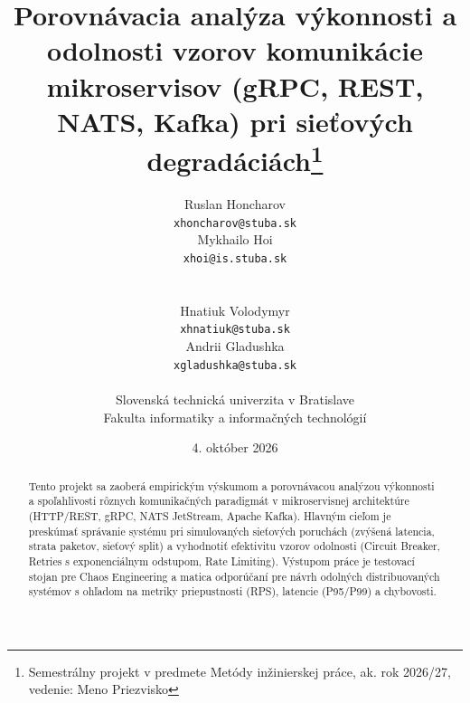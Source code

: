 \documentclass[10pt,twoside,slovak,a4paper]{article}
\title{Porovnávacia analýza výkonnosti a odolnosti vzorov komunikácie mikroservisov (gRPC, REST, NATS, Kafka) pri sieťových degradáciách\thanks{Semestrálny projekt v predmete Metódy inžinierskej práce, ak. rok 2026/27, vedenie: Meno Priezvisko}}
\author{
    \begin{minipage}{0.45\textwidth}
        \centering
        Ruslan Honcharov\\[2pt]
        {\small \texttt{xhoncharov@stuba.sk}}
    \end{minipage}
    \begin{minipage}{0.45\textwidth}
        \centering
        Mykhailo Hoi\\[2pt]
        {\small \texttt{xhoi@is.stuba.sk}}
    \end{minipage}
    \\[12pt]
    \begin{minipage}{0.45\textwidth}
        \centering
        Hnatiuk Volodymyr\\[2pt]
        {\small \texttt{xhnatiuk@stuba.sk}}
    \end{minipage}
    \begin{minipage}{0.45\textwidth}
        \centering
        Andrii Gladushka\\[2pt]
        {\small \texttt{xgladushka@stuba.sk}}
    \end{minipage}
    \\[14pt]
    {\small Slovenská technická univerzita v Bratislave}\\
    {\small Fakulta informatiky a informačných technológií}
}
\date{\small 4. október 2026}
\begin{document}
\maketitle

\begin{abstract}
Tento projekt sa zaoberá empirickým výskumom a porovnávacou analýzou výkonnosti a spoľahlivosti rôznych komunikačných paradigmát v mikroservisnej architektúre (HTTP/REST, gRPC, NATS JetStream, Apache Kafka). Hlavným cieľom je preskúmať správanie systému pri simulovaných sieťových poruchách (zvýšená latencia, strata paketov, sieťový split) a vyhodnotiť efektivitu vzorov odolnosti (Circuit Breaker, Retries s exponenciálnym odstupom, Rate Limiting). Výstupom práce je testovací stojan pre Chaos Engineering a matica odporúčaní pre návrh odolných distribuovaných systémov s ohľadom na metriky priepustnosti (RPS), latencie (P95/P99) a chybovosti.
\end{abstract}










\end{document}
